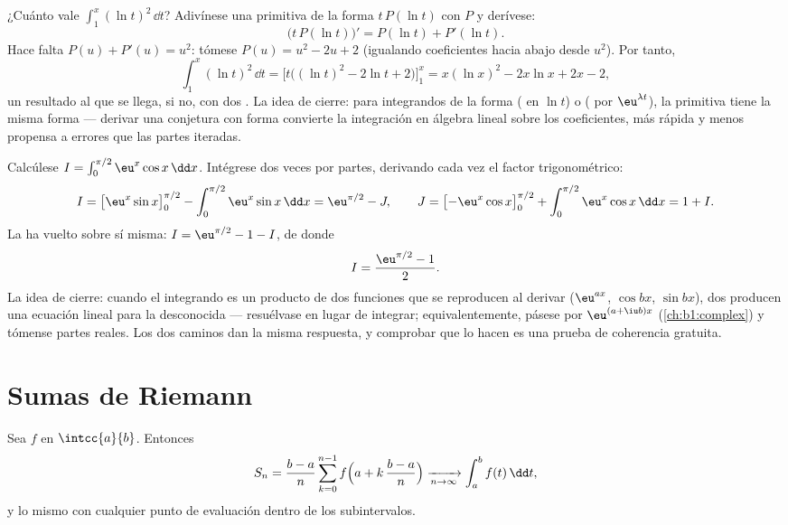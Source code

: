 \begin{example}\label{ex:b1:integration:guessdiff}
¿Cuánto vale $\int_1^x (\ln t)^2\,\dd t$? Adivínese una primitiva de
la forma $t\,P(\ln t)$ con $P$  y derívese:
\[
\bigl(t\,P(\ln t)\bigr)' = P(\ln t) + P'(\ln t) .
\]
Hace falta $P(u) + P'(u) = u^2$: tómese $P(u) = u^2 - 2u + 2$
(igualando coeficientes hacia abajo desde $u^2$). Por tanto,
\[
\int_1^x (\ln t)^2\,\dd t
= \bigl[t\bigl((\ln t)^2 - 2\ln t + 2\bigr)\bigr]_1^x
= x(\ln x)^2 - 2x\ln x + 2x - 2 ,
\]
un resultado al que se llega, si no, con dos .
La idea de cierre: para integrandos de la forma ( en $\ln t$)
o ( por $\eu^{\lambda t}$), la primitiva tiene la misma
forma --- derivar una conjetura con forma convierte la integración en
álgebra lineal sobre los coeficientes, más rápida y menos propensa a
errores que las partes iteradas.
\end{example}

\begin{example}\label{ex:b1:integration:boomerang}
Calcúlese $I = \int_0^{\pi/2} \eu^x \cos x\,\dd x$. Intégrese dos
veces por partes, derivando cada vez el factor trigonométrico:
\[
I = \bigl[\eu^x \sin x\bigr]_0^{\pi/2}
- \int_0^{\pi/2} \eu^x \sin x\,\dd x
= \eu^{\pi/2} - J,
\qquad
J = \bigl[-\eu^x\cos x\bigr]_0^{\pi/2}
+ \int_0^{\pi/2} \eu^x\cos x\,\dd x = 1 + I .
\]
La  ha vuelto sobre sí misma: $I = \eu^{\pi/2} - 1 - I$, de
donde
\[
I = \frac{\eu^{\pi/2} - 1}{2} .
\]
La idea de cierre: cuando el integrando es un producto de dos
funciones que se reproducen al derivar ($\eu^{ax}$, $\cos bx$,
$\sin bx$), dos  producen una ecuación lineal
para la  desconocida --- resuélvase en lugar de integrar;
equivalentemente, pásese por $\eu^{(a + \iu b)x}$
(\cref{ch:b1:complex}) y tómense partes reales. Los dos caminos dan la
misma respuesta, y comprobar que lo hacen es una prueba de coherencia
gratuita.
\end{example}

\section{Sumas de Riemann}

\begin{theorem}\label{thm:b1:integration:riemann}
Sea $f$  en $\intcc{a}{b}$. Entonces
\[
S_n = \frac{b - a}{n} \sum_{k=0}^{n-1}
f\Bigl(a + k\,\frac{b-a}{n}\Bigr)
\xrightarrow[n \to \infty]{} \int_a^b f(t)\, \dd t ,
\]
y lo mismo con cualquier punto de evaluación dentro de los subintervalos.
\end{theorem}

